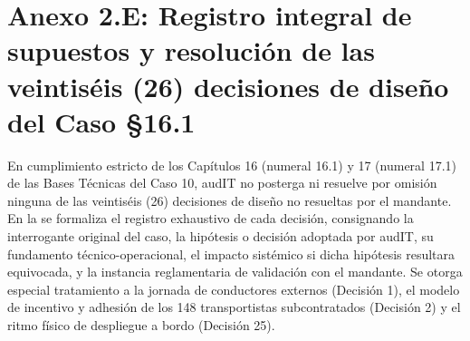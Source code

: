 \clearpage

\section*{Anexo 2.E: Registro integral de supuestos y resolución de las veintiséis (26) decisiones de diseño del Caso §16.1}\label{sec:2-anexo-2e}

En cumplimiento estricto de los Capítulos 16 (numeral 16.1) y 17 (numeral 17.1) de las Bases Técnicas del Caso 10, audIT no posterga ni resuelve por omisión ninguna de las veintiséis (26) decisiones de diseño no resueltas por el mandante. En la  se formaliza el registro exhaustivo de cada decisión, consignando la interrogante original del caso, la hipótesis o decisión adoptada por audIT, su fundamento técnico-operacional, el impacto sistémico si dicha hipótesis resultara equivocada, y la instancia reglamentaria de validación con el mandante. Se otorga especial tratamiento a la jornada de conductores externos (Decisión 1), el modelo de incentivo y adhesión de los 148 transportistas subcontratados (Decisión 2) y el ritmo físico de despliegue a bordo (Decisión 25).

